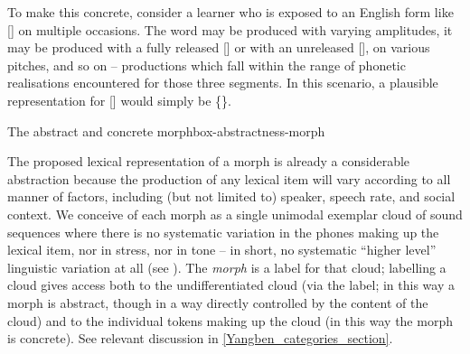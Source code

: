 To make this concrete, consider a learner who is exposed to an English  form like [] on multiple occasions. The word may be produced with varying amplitudes, it may be produced with a fully released [] or with an unreleased [], on various pitches, and so on -- productions which fall within the range of phonetic realisations encountered for those three segments. In this scenario, a plausible representation for [] would simply be \{\}.

\begin{dadpbox}{The abstract and concrete morph}{box-abstractness-morph}



The proposed lexical representation of a morph is already a considerable abstraction because the production of any lexical item will vary according to all manner of factors, including (but not limited to) speaker, speech rate, and social context. We conceive of each morph as a single unimodal exemplar cloud of sound sequences where there is no systematic variation in the phones making up the lexical item, nor in stress, nor in tone -- in short, no systematic ``higher level'' linguistic variation at all (see \citealt{vandeWeijer:2012}). The \textit{morph} is a label for that cloud; labelling a cloud gives access  both  to the undifferentiated cloud (via the label; in this way a morph is abstract, though in a way directly controlled by the content of the cloud)  and to the  individual tokens making up the cloud (in this way the morph is concrete). See relevant discussion in \textsection\ref{Yangben_categories_section}.
\end{dadpbox}



